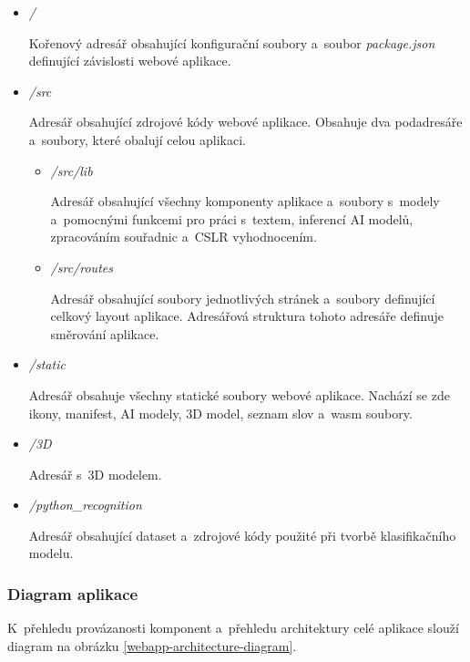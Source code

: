 \documentclass[
  master,
  program=ainfvs,
  biblatex,
  figures=true,
  tables=false,
  sourcecodes=true,
  glossaries,
  index
]{kidiplom}
\begin{document}
            \begin{itemize}
                \item \emph{/} \par
                    Kořenový adresář obsahující konfigurační soubory a~soubor \emph{package.json} definující závislosti webové aplikace.
                    
                \item \emph{/src} \par
                    Adresář obsahující zdrojové kódy webové aplikace. Obsahuje dva podadresáře a~soubory, které obalují celou aplikaci.
                    \begin{itemize}
                        \item \emph{/src/lib} \par
                            Adresář obsahující všechny komponenty aplikace a~soubory s~modely a~pomocnými funkcemi pro práci s~textem, inferencí AI modelů, zpracováním souřadnic a~CSLR vyhodnocením.
                        \item \emph{/src/routes} \par
                            Adresář obsahující soubory jednotlivých stránek a~soubory definující celkový layout aplikace. Adresářová struktura tohoto adresáře definuje směrování aplikace.
                    \end{itemize}
                    
                \item \emph{/static} \par
                    Adresář obsahuje všechny statické soubory webové aplikace. Nachází se zde ikony, manifest, AI modely, 3D model, seznam slov a~wasm soubory.

                \item \emph{/3D} \par
                    Adresář s~3D modelem.
                    
                \item \emph{/python\_recognition} \par
                   Adresář obsahující dataset a~zdrojové kódy použité při tvorbě klasifikačního modelu.
            \end{itemize}
         
        \subsubsection{Diagram aplikace}
            K~přehledu provázanosti komponent a~přehledu architektury celé aplikace slouží diagram na obrázku \ref{webapp-architecture-diagram}.
\end{document}
